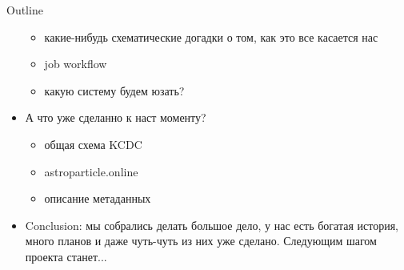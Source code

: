\documentclass[18pt]{beamer}
\begin{document}
\begin{frame}[allowframebreaks]{Outline}
\begin{itemize}
\begin{itemize}
        \item какие-нибудь схематические догадки о том, как это все касается нас
        \item job workflow
        \item какую систему будем юзать?
\end{itemize}
\item А что уже сделанно к наст моменту?
    \begin{itemize}
     \item общая схема KCDC
     \item astroparticle.online
     \item описание метаданных
    \end{itemize}
\item Conclusion: мы собрались делать большое дело, у нас есть богатая история, много планов и даже чуть-чуть из них уже сделано. Следующим шагом проекта станет...
\end{itemize}

\end{frame}
\end{document}
